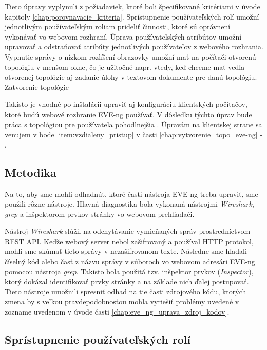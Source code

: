 Tieto úpravy vyplynuli z požiadaviek, ktoré boli špecifikované kritériami v úvode kapitoly \ref{chap:porovnavacie_kriteria}. Sprístupnenie používateľských rolí umožní jednotlivým používateľským roliam prideliť činnosti, ktoré sú oprávnení vykonávať vo webovom rozhraní. Úprava používateľských atribútov umožní upravovať a odstraňovať atribúty jednotlivých používateľov z webového rozhrania. Vypnutie správy o nízkom rozlíšení obrazovky umožní mať na počítači otvorenú topológiu v menšom okne, čo je užitočné napr. vtedy, keď chceme mať vedľa otvorenej topológie aj zadanie úlohy v textovom dokumente pre danú topológiu. Zatvorenie topológie 

Takisto je vhodné po inštalácii upraviť aj konfiguráciu klientských počítačov, ktoré budú webové rozhranie EVE-ng používať. V dôsledku týchto úprav bude práca s topológiou pre používateľa pohodlnejšia . Úpravám na klientskej strane sa venujem v bode \ref{item:vzdialeny_pristup} v časti \ref{chap:vytvorenie_topo_eve-ng} - .





\subsection{Metodika}

Na to, aby sme mohli odhadnúť, ktoré časti nástroja EVE-ng treba upraviť, sme použili rôzne nástroje. Hlavná diagnostika bola vykonaná nástrojmi \emph{Wireshark}, \emph{grep} a inšpektorom prvkov stránky vo webovom prehliadači.

Nástroj \emph{Wireshark} slúžil na odchytávanie vymieňaných správ prostredníctvom REST API. Keďže webový server nebol zašifrovaný a používal HTTP protokol, mohli sme skúmať tieto správy v nezašifrovanom texte. Následne sme hľadali číselný kód alebo časť z názvu správy v súboroch vo webovom adresári EVE-ng pomocou nástroja \emph{grep}. Takisto bola použitá tzv. inšpektor prvkov (\emph{Inspector}), ktorý dokázal identifikovať prvky stránky a na základe nich ďalej postupovať. Tieto nástroje umožnili spresniť odhad na tie časti zdrojového kódu, ktorých zmena by s veľkou pravdepodobnosťou mohla vyriešiť problémy uvedené v zozname uvedenom v úvode časti \ref{chap:eve_ng_uprava_zdroj_kodov}.






\subsection{Sprístupnenie používateľských rolí}
\label{chap:eve_ng_pouzivatelske_role}

